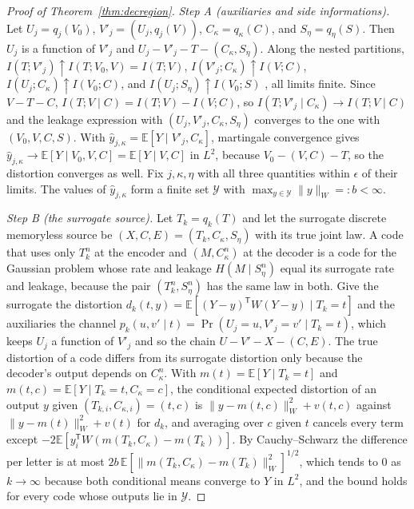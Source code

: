 \documentclass[11pt,onecolumn]{IEEEtran}
\newcommand{\E}{\mathbb{E}}
\begin{document}
\begin{proof}[Proof of Theorem~\ref{thm:decregion}]
\emph{Step A (auxiliaries and side informations).} Let $U_j=q_j(V_0)$,
$V'_j=(U_j,q_j(V))$, $C_\kappa=q_\kappa(C)$, and $S_\eta=q_\eta(S)$. Then
$U_j$ is a function of $V'_j$ and $U_j-V'_j-T-(C_\kappa,S_\eta)$. Along the
nested partitions, $I(T;V'_j)\uparrow I(T;V_0,V)=I(T;V)$,
$I(V'_j;C_\kappa)\uparrow I(V;C)$, $I(U_j;C_\kappa)\uparrow I(V_0;C)$, and
$I(U_j;S_\eta)\uparrow I(V_0;S)$ \cite[Ch.~2]{pinsker1964}, all limits
finite. Since $V-T-C$, $I(T;V\mid C)=I(T;V)-I(V;C)$, so
$I(T;V'_j\mid C_\kappa)\to I(T;V\mid C)$ and the leakage expression with
$(U_j,V'_j,C_\kappa,S_\eta)$ converges to the one with $(V_0,V,C,S)$. With
$\hat y_{j,\kappa}=\E[Y\mid V'_j,C_\kappa]$, martingale convergence gives
$\hat y_{j,\kappa}\to\E[Y\mid V_0,V,C]=\E[Y\mid V,C]$ in $L^2$, because
$V_0-(V,C)-T$, so the distortion converges as well. Fix $j,\kappa,\eta$
with all three quantities within $\epsilon$ of their limits. The values
of $\hat y_{j,\kappa}$ form a finite set $\mathcal Y$ with
$\max_{y\in\mathcal Y}\|y\|_W=:b<\infty$.

\emph{Step B (the surrogate source).} Let $T_k=q_k(T)$ and let the
surrogate discrete memoryless source be $(X,C,E)=(T_k,C_\kappa,S_\eta)$ with
its true joint law. A code that uses only $T_k^n$ at the encoder and
$(M,C_\kappa^n)$ at the decoder is a code for the Gaussian problem whose
rate and leakage $H(M\mid S_\eta^n)$ equal its surrogate rate and leakage,
because the pair $(T_k^n,S_\eta^n)$ has the same law in both. Give the
surrogate the distortion
$d_k(t,y)=\E[(Y-y)^{\mathsf T}W(Y-y)\mid T_k=t]$ and the auxiliaries the
channel $p_k(u,v'\mid t)=\Pr(U_j=u,V'_j=v'\mid T_k=t)$, which keeps
$U_j$ a function of $V'_j$ and so the chain $U-V'-X-(C,E)$. The true
distortion of a code differs from its surrogate distortion only because
the decoder's output depends on $C_\kappa^n$. With
$m(t)=\E[Y\mid T_k=t]$ and $m(t,c)=\E[Y\mid T_k=t,C_\kappa=c]$, the conditional
expected distortion of an output $y$ given $(T_{k,i},C_{\kappa,i})=(t,c)$ is
$\|y-m(t,c)\|_W^2+v(t,c)$ against $\|y-m(t)\|_W^2+v(t)$ for $d_k$, and
averaging over $c$ given $t$ cancels every term except
$-2\E[y_i^{\mathsf T}W(m(T_k,C_\kappa)-m(T_k))]$. By Cauchy--Schwarz the
difference per letter is at most
$2b\,\E[\|m(T_k,C_\kappa)-m(T_k)\|_W^2]^{1/2}$, which tends to $0$ as
$k\to\infty$ because both conditional means converge to $Y$ in $L^2$, and
the bound holds for every code whose outputs lie in $\mathcal Y$.


\end{proof}
\end{document}
